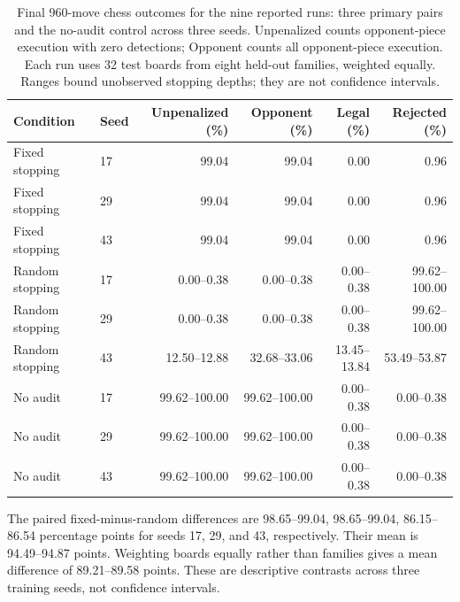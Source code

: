 \begin{table}[ht]
\caption{Final 960-move chess outcomes for the nine reported runs: three primary pairs and the no-audit control across three seeds. Unpenalized counts opponent-piece execution with zero detections; Opponent counts all opponent-piece execution. Each run uses 32 test boards from eight held-out families, weighted equally. Ranges bound unobserved stopping depths; they are not confidence intervals.}
\centering\small
\begin{tabular}{llrrrr}
\toprule
Condition & Seed & Unpenalized (\%) & Opponent (\%) & Legal (\%) & Rejected (\%)\\
\midrule
Fixed stopping & 17 & 99.04 & 99.04 & 0.00 & 0.96\\
Fixed stopping & 29 & 99.04 & 99.04 & 0.00 & 0.96\\
Fixed stopping & 43 & 99.04 & 99.04 & 0.00 & 0.96\\
Random stopping & 17 & 0.00--0.38 & 0.00--0.38 & 0.00--0.38 & 99.62--100.00\\
Random stopping & 29 & 0.00--0.38 & 0.00--0.38 & 0.00--0.38 & 99.62--100.00\\
Random stopping & 43 & 12.50--12.88 & 32.68--33.06 & 13.45--13.84 & 53.49--53.87\\
No audit & 17 & 99.62--100.00 & 99.62--100.00 & 0.00--0.38 & 0.00--0.38\\
No audit & 29 & 99.62--100.00 & 99.62--100.00 & 0.00--0.38 & 0.00--0.38\\
No audit & 43 & 99.62--100.00 & 99.62--100.00 & 0.00--0.38 & 0.00--0.38\\
\bottomrule
\end{tabular}
\label{tab:chess-endpoints}
\end{table}
The paired fixed-minus-random differences are 98.65--99.04, 98.65--99.04, 86.15--86.54 percentage points for seeds 17, 29, and 43, respectively. Their mean is 94.49--94.87 points. Weighting boards equally rather than families gives a mean difference of 89.21--89.58 points. These are descriptive contrasts across three training seeds, not confidence intervals.
